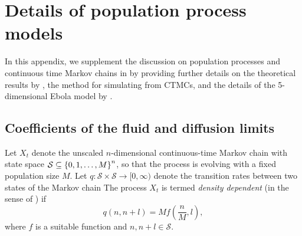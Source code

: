\chapter{Details of population process models}\label{app:epi}
In this appendix, we supplement the discussion on population processes and continuous time Markov chains in  by providing further details on the theoretical results by \citet{Kurtz_1970_SolutionsOrdinaryDifferential,Kurtz_1971_LimitTheoremsSequences}, the method for simulating from CTMCs, and the details of the 5-dimensional Ebola model by \citet{LegrandEtAl_2007_UnderstandingDynamicsEbola}.

\section{Coefficients of the fluid and diffusion limits}\label{app:epi_kurtz}
Let \(X_t\) denote the unscaled \(n\)-dimensional continuous-time Markov chain with state space \(\mathcal{S} \subseteq \set{0, 1, \dotsc, M}^n\), so that the process is evolving with a fixed population size \(M\).
Let \(q\colon \mathcal{S}\times\mathcal{S} \to [0,\infty)\) denote the transition rates between two states of the Markov chain
The process \(X_t\) is termed \emph{density dependent} (in the sense of \citet{Kurtz_1970_SolutionsOrdinaryDifferential}) if
\begin{equation}
	q\!\left(n, n+l\right) = Mf\!\left(\frac{n}{M}, l\right),
	\label{eqn:ctmc_dens_dep}
\end{equation}
where \(f\) is a suitable function and \(n, n+l \in \mathcal{S}\).
